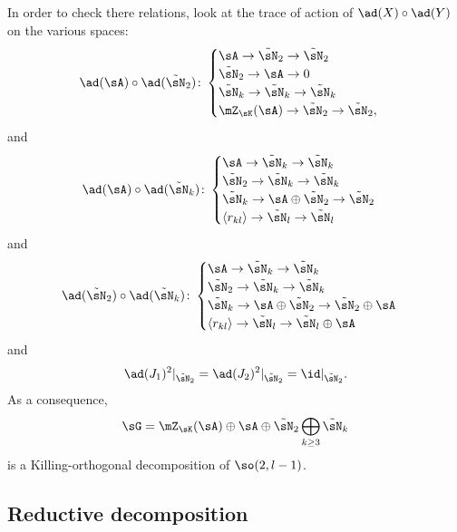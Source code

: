 In order to check there relations, look at the trace of action of $\ad(X)\circ\ad(Y)$ on the various spaces:
\begin{equation}
	\ad(\sA)\circ\ad(\tilde\sN_2) \colon
	\begin{cases}
		\sA\to\tilde\sN_2\to\tilde\sN_2         \\
		\tilde\sN_2\to\sA\to 0                  \\
		\tilde\sN_k\to\tilde\sN_k\to\tilde\sN_k \\
		\mZ_{\sK}(\sA)\to\tilde\sN_2\to\tilde\sN_2,
	\end{cases}
\end{equation}
and
\begin{equation}
	\ad(\sA)\circ\ad(\tilde\sN_k)\colon
	\begin{cases}
		\sA\to\tilde\sN_k\to\tilde\sN_k                  \\
		\tilde\sN_2\to\tilde\sN_k\to\tilde\sN_k          \\
		\tilde\sN_k\to\sA\oplus\tilde\sN_2\to\tilde\sN_2 \\
		\langle r_{kl}\rangle\to\tilde\sN_l\to\tilde\sN_l
	\end{cases}
\end{equation}
and
\begin{equation}
	\ad(\tilde\sN_2)\circ\ad(\tilde\sN_k)\colon
	\begin{cases}
		\sA\to\tilde\sN_k\to\tilde\sN_k                           \\
		\tilde\sN_2\to\tilde\sN_k\to\tilde\sN_k                   \\
		\tilde\sN_k\to\sA\oplus\tilde\sN_2\to\tilde\sN_2\oplus\sA \\
		\langle r_{kl}\rangle\to\tilde\sN_l\to\tilde\sN_l\oplus\sA
	\end{cases}
\end{equation}
and
\begin{equation}
	\ad(J_1)^2|_{\tilde\sN_2}=\ad(J_2)^2|_{\tilde\sN_2}=\id|_{\tilde\sN_2}.
\end{equation}
%
As a consequence,
\begin{equation}		\label{LONGEqDecompGPourKillOrtho}
	\sG=\mZ_{\sK}(\sA)\oplus\sA\oplus\tilde\sN_2\bigoplus_{k\geq 3}\tilde\sN_k
\end{equation}
is a Killing-orthogonal decomposition of $\so(2,l-1)$.

%
\subsection{Reductive decomposition}
%
\label{LONGSubSecReductiveDecompQ}

